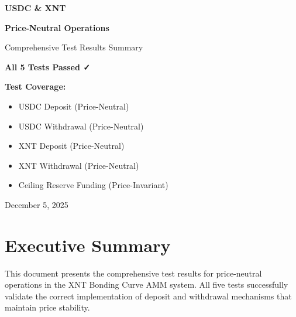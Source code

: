 \documentclass[11pt,a4paper]{article}
\begin{document}
\begin{titlepage}
    \centering
    \vspace*{2cm}

    {\Huge\bfseries\textcolor{primary}{USDC \& XNT}\par}
    \vspace{0.5cm}
    {\Huge\bfseries\textcolor{primary}{Price-Neutral Operations}\par}
    \vspace{1cm}
    {\Large\textcolor{secondary}{Comprehensive Test Results Summary}\par}

    \vspace{2cm}

    \begin{tcolorbox}[colback=primary!10,colframe=primary,width=0.8\textwidth]
        \centering
        {\Large\bfseries All 5 Tests Passed ✓}
    \end{tcolorbox}

    \vspace{2cm}

    {\large
    \textbf{Test Coverage:}\\
    \vspace{0.5cm}
    \begin{itemize}[leftmargin=2cm]
        \item USDC Deposit (Price-Neutral)
        \item USDC Withdrawal (Price-Neutral)
        \item XNT Deposit (Price-Neutral)
        \item XNT Withdrawal (Price-Neutral)
        \item Ceiling Reserve Funding (Price-Invariant)
    \end{itemize}
    }

    \vfill

    {\large December 5, 2025\par}

\end{titlepage}

\tableofcontents
\newpage

\section{Executive Summary}

This document presents the comprehensive test results for price-neutral operations in the XNT Bonding Curve AMM system. All five tests successfully validate the correct implementation of deposit and withdrawal mechanisms that maintain price stability.
\end{document}
